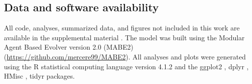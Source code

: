 \subsection{Data and software availability}
All code, analyses, summarized data, and figures not included in this work are available in the supplemental material \citep{austin_ferguson_2024_11507982}.
The model was built using the Modular Agent Based Evolver version 2.0 (MABE2) (\url{https://github.com/mercere99/MABE2}). 
All analyses and plots were generated using the R statistical computing language version 4.1.2 \citep{r_core_team_r_v4} and the ggplot2 \citep{R-ggplot2}, dplyr \citep{wickhamDplyrGrammarData2022}, HMisc \citep{harrelljrHmiscHarrellMiscellaneous2020}, tidyr \citep{wickhamTidyrTidyMessy2022} packages. %











